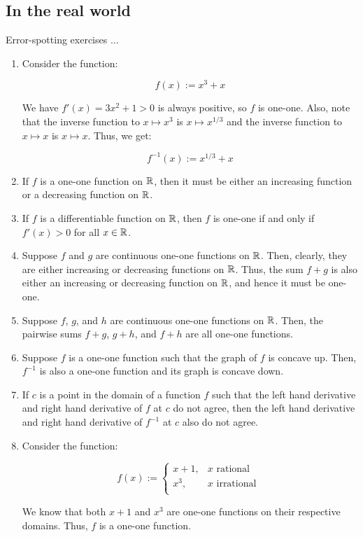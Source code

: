 \documentclass[10pt]{amsart}
\begin{document}
\subsection{In the real world}

Error-spotting exercises ...

\begin{enumerate}
\item Consider the function:

  $$f(x) := x^3 + x$$

  We have $f'(x) = 3x^2 + 1 > 0$ is always positive, so $f$ is
  one-one. Also, note that the inverse function to $x \mapsto x^3$ is
  $x \mapsto x^{1/3}$ and the inverse function to $x \mapsto x$ is $x
  \mapsto x$. Thus, we get:

  $$f^{-1}(x) := x^{1/3} + x$$

\item If $f$ is a one-one function on $\mathbb{R}$, then it must be either an
  increasing function or a decreasing function on $\mathbb{R}$.
\item If $f$ is a differentiable function on $\mathbb{R}$, then $f$ is one-one
  if and only if $f'(x) > 0$ for all $x \in \mathbb{R}$.
\item Suppose $f$ and $g$ are continuous one-one functions on
  $\mathbb{R}$. Then, clearly, they are either increasing or decreasing
  functions on $\mathbb{R}$. Thus, the sum $f + g$ is also either an
  increasing or decreasing function on $\mathbb{R}$, and hence it must be
  one-one.
\item Suppose $f$, $g$, and $h$ are continuous one-one functions on
  $\mathbb{R}$. Then, the pairwise sums $f + g$, $g + h$, and $f + h$ are all
  one-one functions.
\item Suppose $f$ is a one-one function such that the graph of $f$ is
  concave up. Then, $f^{-1}$ is also a one-one function and its graph
  is concave down.
\item If $c$ is a point in the domain of a function $f$ such that the
  left hand derivative and right hand derivative of $f$ at $c$ do not
  agree, then the left hand derivative and right hand derivative of
  $f^{-1}$ at $c$ also do not agree.
\item Consider the function:

  $$f(x) := \left\lbrace\begin{array}{rl} x + 1, & x \text{ rational } \\ x^3, & x \text{ irrational } \\\end{array}\right.$$

  We know that both $x + 1$ and $x^3$ are one-one functions on their
  respective domains. Thus, $f$ is a one-one function.

\end{enumerate}
\end{document}
